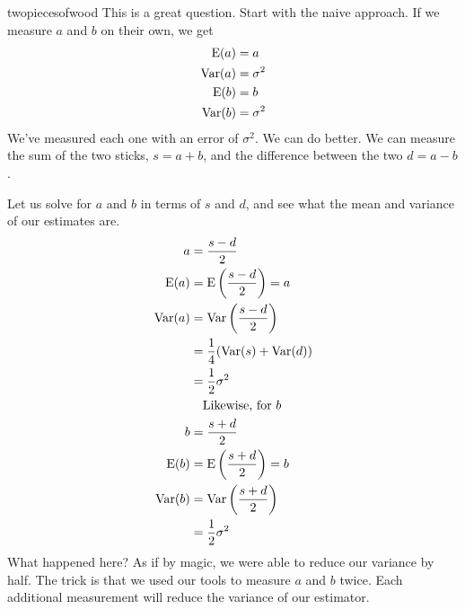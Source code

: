 \begin{answer}{twopiecesofwood}
This is a great question.
Start with the naive approach.
If we measure $a$ and $b$ on their own, we get
\begin{align*}
\operatorname{\mathrm{E}}(a)   &= a \\
\operatorname{\mathrm{Var}}(a) &= \sigma^2 \\
\operatorname{\mathrm{E}}(b)   &= b \\
\operatorname{\mathrm{Var}}(b) &= \sigma^2
\end{align*}
We've measured each one with an error of $\sigma^2$.
We can do better.
We can measure the sum of the two sticks, $s = a+b$, and the difference between the two $d = a-b$.
\begin{center}


\end{center}
Let us solve for $a$ and $b$ in terms of $s$ and $d$, and see what the mean and variance of our estimates are.
\begin{align*}
a   &= \frac{s - d}{2} \\
\operatorname{\mathrm{E}}(a)  &= \operatorname{\mathrm{E}}\left(\frac{s - d}{2}\right)
        =  a \\
\operatorname{\mathrm{Var}}(a) &= \operatorname{\mathrm{Var}}\left(\frac{s - d}{2} \right) \\
        &= \frac{1}{4}(\operatorname{\mathrm{Var}}(s) + \operatorname{\mathrm{Var}}(d)) \\
        &= \frac{1}{2}\sigma^2 \\
        & \quad \text{Likewise, for } b \\
b   &= \frac{s + d}{2} \\
\operatorname{\mathrm{E}}(b)  &= \operatorname{\mathrm{E}}\left(\frac{s + d}{2}\right)
        =  b \\
\operatorname{\mathrm{Var}}(b) &= \operatorname{\mathrm{Var}}\left(\frac{s + d}{2} \right) \\
        &= \frac{1}{2}\sigma^2
\end{align*}
What happened here? As if by magic, we were able to reduce our variance by half.
The trick is that we used our tools to measure $a$ and $b$ twice.
Each additional measurement will reduce the variance of our estimator.
\end{answer}
